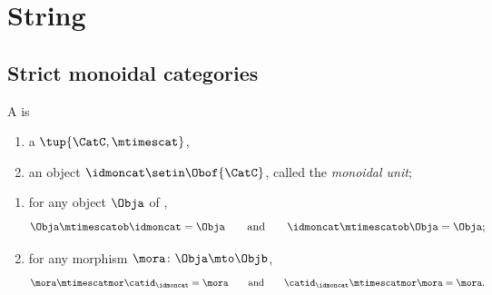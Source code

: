 
\section{String }\label{sec:monoidal-stacking}


\subsection{Strict monoidal categories}

\begin{ctdefinition}
    \label{def:strict-monoidal-cat}
    A  is

    \constit

    \begin{enumerate}
        \item a  $\tup{\CatC, \mtimescat}$,
        \item an object $\idmoncat \setin \Obof{\CatC}$, called the \emph{monoidal unit};
    \end{enumerate}

    \condit

    \begin{enumerate}
        \item for any object $\Obja$ of \CatC,
              \begin{equation}\label{eq:strict-mon-stacking-cat-cond1}
                  \Obja \mtimescatob \idmoncat = \Obja \qquad \text{and} \qquad \idmoncat \mtimescatob \Obja = \Obja;
              \end{equation}
        \item for any morphism $\mora \colon \Obja \mto \Objb$,
              \begin{equation}\label{eq:strict-mon-stacking-cat-cond2}
                  \mora \mtimescatmor \catid_\idmoncat = \mora \qquad \text{and} \qquad \catid_\idmoncat \mtimescatmor  \mora = \mora.
              \end{equation}
    \end{enumerate}
\end{ctdefinition}


